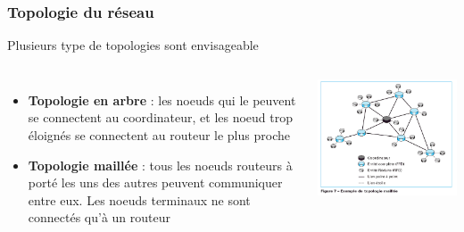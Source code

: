 \documentclass{beamer}
\begin{document}
  
  \begin{frame}
   \frametitle{Topologie du réseau}
   \begin{block}{Plusieurs type de topologies sont envisageable}
   \begin{columns}
    \begin{itemize}
     \item \textbf{Topologie en arbre} : les noeuds qui le peuvent se connectent au coordinateur, et les noeud trop éloignés se connectent au routeur le plus proche
     \item \textbf{Topologie maillée} : tous les noeuds routeurs à porté les uns des autres peuvent communiquer entre eux. Les noeuds terminaux ne sont connectés qu'à un routeur
    \end{itemize}
    \includegraphics[scale=0.25]{Topologie-Maille.png}
   \end{columns}
   \end{block}
  \end{frame}
  
\end{document}
